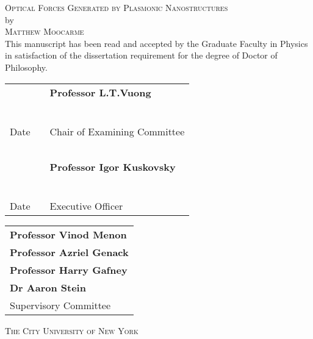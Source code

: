 \begin{center}

\textsc{Optical Forces Generated by Plasmonic Nanostructures} \\
by \\
\textsc{Matthew Moocarme} 
\\[0.1in]
This manuscript has been read and accepted by the Graduate Faculty in Physics in satisfaction of the dissertation requirement for the degree of Doctor of Philosophy.
\end{center}

\vspace{0.75in}

\begin{tabular}{p{1.75in}p{0.5in}p{3.5in}}
~                                   & & \textbf{Professor L.T.Vuong}\\
~                                   & & \\
\hrulefill                          & &\hrulefill \\
Date                                & & Chair of Examining Committee\\
~                                   & & \\
~                                   & & \textbf{Professor Igor Kuskovsky}\\
~                                   & & \\
\hrulefill                          & &\hrulefill \\
Date                                & & Executive Officer\\
\end{tabular}

\vspace{0.75in}

\begin{tabular}{l}
\textbf{Professor Vinod Menon} \\
\textbf{Professor Azriel Genack} \\
\textbf{Professor Harry Gafney} \\
\textbf{Dr Aaron Stein} \\
Supervisory Committee \\
\end{tabular}


\vspace{\fill}
\begin{center}
\textsc{The City University of New York}
\end{center}